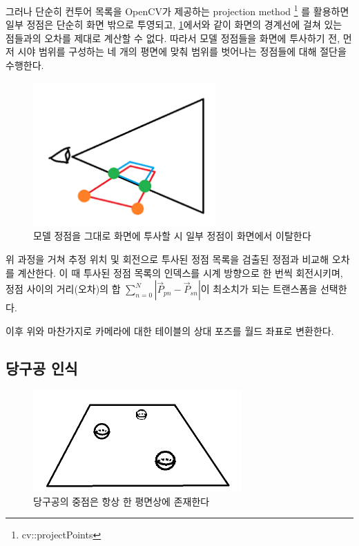 \documentclass[10pt]{oblivoir}
\begin{document}
그러나 단순히 컨투어 목록을 OpenCV가 제공하는 projection method
\footnote{cv::projectPoints}
를 활용하면 일부 정점은 단순히 화면 밖으로 투영되고, \cref{fig;invalid-sight-projection}에서와 같이 화면의 경계선에 걸쳐 있는 점들과의 오차를 제대로 계산할 수 없다. 따라서 모델 정점들을 화면에 투사하기 전, 먼저 시야 범위를 구성하는 네 개의 평면에 맞춰 범위를 벗어나는 정점들에 대해 절단을 수행한다.

\begin{figure}[h]
    \centering
    \includegraphics[width=7cm]{img/sight-invalid-culling.png}
    \caption{모델 정점을 그대로 화면에 투사할 시 일부 정점이 화면에서 이탈한다}
    \label{fig;invalid-sight-projection}
\end{figure}

위 과정을 거쳐 추정 위치 및 회전으로 투사된 정점 목록을 검출된 정점과 비교해 오차를 계산한다. 이 때  투사된 정점 목록의 인덱스를 시계 방향으로 한 번씩 회전시키며, 정점 사이의 거리(오차)의 합 $\sum_{n=0}^{N}|\vec{P}_{pn} - \vec{P}_{sn}|$이 최소치가 되는 트랜스폼을 선택한다.

이후 위와 마찬가지로 카메라에 대한 테이블의 상대 포즈를 월드 좌표로 변환한다.



\subsection{당구공 인식}

\begin{figure}[ht]
    \centering
    \includegraphics[width=8cm]{img/ball-recognition-introduce.png}
    \caption{당구공의 중점은 항상 한 평면상에 존재한다}
    \label{fig;ball-recognition-intro}
\end{figure}
\end{document}
